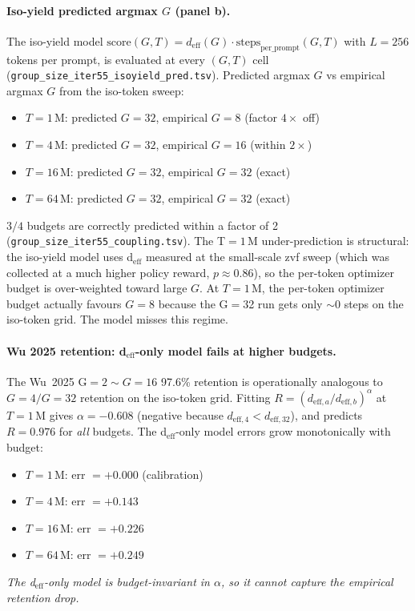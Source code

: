 \paragraph{Iso-yield predicted argmax $G$ (panel b).}
The iso-yield model
$\mathrm{score}(G, T) = d_{\mathrm{eff}}(G) \cdot
\mathrm{steps}_{\mathrm{per\_prompt}}(G, T)$
with $L = 256$ tokens per prompt, is evaluated at every
$(G, T)$ cell (\texttt{group\_size\_iter55\_isoyield\_pred.tsv}).
Predicted argmax $G$ vs empirical argmax $G$ from the iso-token
sweep:
\begin{itemize}
  \item $T{=}1$\,M: predicted $G{=}32$, empirical $G{=}8$ (factor $4\times$ off)
  \item $T{=}4$\,M: predicted $G{=}32$, empirical $G{=}16$ (within $2\times$)
  \item $T{=}16$\,M: predicted $G{=}32$, empirical $G{=}32$ (exact)
  \item $T{=}64$\,M: predicted $G{=}32$, empirical $G{=}32$ (exact)
\end{itemize}
$3/4$ budgets are correctly predicted within a factor of 2
(\texttt{group\_size\_iter55\_coupling.tsv}).  The T$=1$\,M
under-prediction is structural: the iso-yield model uses
d$_{\mathrm{eff}}$ measured at the small-scale zvf sweep (which was
collected at a much higher policy reward, $p \approx 0.86$), so the
per-token optimizer budget is over-weighted toward large $G$.  At
$T{=}1$\,M, the per-token optimizer budget actually favours $G{=}8$
because the G$=$32 run gets only $\sim$0 steps on the iso-token
grid.  The model misses this regime.

\paragraph{Wu 2025 retention: d$_{\mathrm{eff}}$-only model fails at higher budgets.}
The Wu~2025 G$ = 2 \sim G = 16$ 97.6\% retention is operationally
analogous to $G{=}4/G{=}32$ retention on the iso-token grid.  Fitting
$R = (d_{\mathrm{eff},a}/d_{\mathrm{eff},b})^\alpha$ at $T{=}1$\,M
gives $\alpha = -0.608$ (negative because $d_{\mathrm{eff},4} <
d_{\mathrm{eff},32}$), and predicts $R = 0.976$ for \emph{all}
budgets.  The d$_{\mathrm{eff}}$-only model errors grow
monotonically with budget:
\begin{itemize}
  \item $T{=}1$\,M: err $= +0.000$ (calibration)
  \item $T{=}4$\,M: err $= +0.143$
  \item $T{=}16$\,M: err $= +0.226$
  \item $T{=}64$\,M: err $= +0.249$
\end{itemize}
\emph{The d$_{\mathrm{eff}}$-only model is budget-invariant in
$\alpha$, so it cannot capture the empirical retention drop.}

